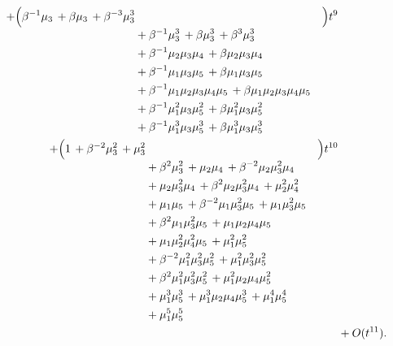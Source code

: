 \documentclass[10pt]{article}
\begin{document}
\[\begin{aligned}
  + \Bigl(\begin{aligned}[t]\beta^{-1}\mu_3\,+\beta\mu_3\,+\beta^{-3}\mu_3^{3} \\
  &{}+\beta^{-1}\mu_3^{3}\,+\beta\mu_3^{3}\,+\beta^{3}\mu_3^{3} \\
  &{}+\beta^{-1}\mu_2\mu_3\mu_4\,+\beta\mu_2\mu_3\mu_4 \\
  &{}+\beta^{-1}\mu_1\mu_3\mu_5\,+\beta\mu_1\mu_3\mu_5 \\
  &{}+\beta^{-1}\mu_1\mu_2\mu_3\mu_4\mu_5\,+\beta\mu_1\mu_2\mu_3\mu_4\mu_5 \\
  &{}+\beta^{-1}\mu_1^{2}\mu_3\mu_5^{2}\,+\beta\mu_1^{2}\mu_3\mu_5^{2} \\
  &{}+\beta^{-1}\mu_1^{3}\mu_3\mu_5^{3}\,+\beta\mu_1^{3}\mu_3\mu_5^{3}\end{aligned}\Bigr)t^{9} \\
  + \Bigl(\begin{aligned}[t]1\,+\beta^{-2}\mu_3^{2}\,+\mu_3^{2} \\
  &{}+\beta^{2}\mu_3^{2}\,+\mu_2\mu_4\,+\beta^{-2}\mu_2\mu_3^{2}\mu_4 \\
  &{}+\mu_2\mu_3^{2}\mu_4\,+\beta^{2}\mu_2\mu_3^{2}\mu_4\,+\mu_2^{2}\mu_4^{2} \\
  &{}+\mu_1\mu_5\,+\beta^{-2}\mu_1\mu_3^{2}\mu_5\,+\mu_1\mu_3^{2}\mu_5 \\
  &{}+\beta^{2}\mu_1\mu_3^{2}\mu_5\,+\mu_1\mu_2\mu_4\mu_5 \\
  &{}+\mu_1\mu_2^{2}\mu_4^{2}\mu_5\,+\mu_1^{2}\mu_5^{2} \\
  &{}+\beta^{-2}\mu_1^{2}\mu_3^{2}\mu_5^{2}\,+\mu_1^{2}\mu_3^{2}\mu_5^{2} \\
  &{}+\beta^{2}\mu_1^{2}\mu_3^{2}\mu_5^{2}\,+\mu_1^{2}\mu_2\mu_4\mu_5^{2} \\
  &{}+\mu_1^{3}\mu_5^{3}\,+\mu_1^{3}\mu_2\mu_4\mu_5^{3}\,+\mu_1^{4}\mu_5^{4} \\
  &{}+\mu_1^{5}\mu_5^{5}\end{aligned}\Bigr)t^{10} \\
  &+ O(t^{11}).
\end{aligned}
\]
\end{document}
